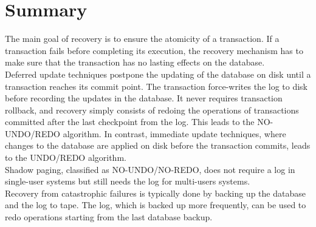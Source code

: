 \section{Summary}
The main goal of recovery is to ensure the atomicity of a transaction. If a transaction fails before completing its execution, the recovery mechanism has to make sure that the transaction has no lasting effects on the database.\\

Deferred update techniques postpone the updating of the database on disk until a transaction reaches its commit point. The transaction force-writes the log to disk before recording the updates in the database. It never requires transaction rollback, and recovery simply consists of redoing the operations of transactions committed after the last checkpoint from the log. This leads to the NO-UNDO/REDO algorithm. In contrast, immediate update techniques, where changes to the database are applied on disk before the transaction commits, leads to the UNDO/REDO algorithm.\\

Shadow paging, classified as NO-UNDO/NO-REDO, does not require a log in single-user systems but still needs the log for multi-users systems.\\

Recovery from catastrophic failures is typically done by backing up the database and the log to tape. The log, which is backed up more frequently, can be used to redo operations starting from the last database backup.